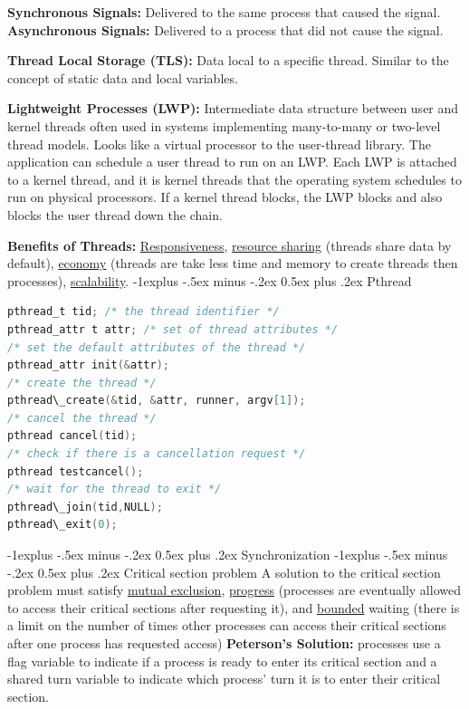 \documentclass[letterpaper, 8pt]{extarticle}
\makeatletter
\renewcommand{\section}{\@startsection{section}{1}{0mm}%
                                {-1explus -.5ex minus -.2ex}%
                                {0.5ex plus .2ex}%
                                {\normalfont\normalsize\bfseries}}
\renewcommand{\subsection}{\@startsection{subsection}{2}{0mm}%
                                {-1explus -.5ex minus -.2ex}%
                                {0.5ex plus .2ex}%
                                {\normalfont\small\bfseries}}
\makeatother
\begin{document}
\begin{multicols*}{6}
    \textbf{Synchronous Signals:} Delivered to the same process that caused the
    signal.
    \textbf{Asynchronous Signals:} Delivered to a process that did not cause the
    signal.

    \textbf{Thread Local Storage (TLS):} Data local to a specific thread. Similar
    to the concept of static data and local variables.

    \textbf{Lightweight Processes (LWP):} Intermediate data structure between
    user and kernel threads often used in systems implementing many-to-many or
    two-level thread models. Looks like a virtual processor to the user-thread
    library. The application can schedule a user thread to
    run on an LWP. Each LWP is attached to a kernel thread, and it is kernel
    threads that the operating system schedules to run on physical processors.
    If a kernel thread blocks, the LWP blocks and also blocks the user thread
    down the chain.

    \textbf{Benefits of Threads:} \underline{Responsiveness},
    \underline{resource sharing} (threads share data by default),
    \underline{economy} (threads are take less time and memory to create
    threads then processes), \underline{scalability}.
    \subsection{Pthread}
    \begin{lstlisting}[language=C]
pthread_t tid; /* the thread identifier */
pthread_attr t attr; /* set of thread attributes */
/* set the default attributes of the thread */
pthread_attr init(&attr);
/* create the thread */
pthread\_create(&tid, &attr, runner, argv[1]);
/* cancel the thread */
pthread cancel(tid);
/* check if there is a cancellation request */
pthread testcancel();
/* wait for the thread to exit */
pthread\_join(tid,NULL);
pthread\_exit(0);
\end{lstlisting}
    \section{Synchronization}
    \subsection{Critical section problem}
        A solution to the critical section problem must satisfy 
        \underline{mutual exclusion},
        \underline{progress} (processes are eventually allowed to access their 
        critical sections after requesting it), and 
        \underline{bounded} waiting (there is a limit 
        on the number of times other processes can access their critical sections
        after one process has requested access)
        \textbf{Peterson's Solution:} processes use a flag variable to indicate 
        if a process is ready to enter its critical section and a shared 
        turn variable to indicate which process' turn it is to enter their 
        critical section.


\end{multicols*}
\end{document}
